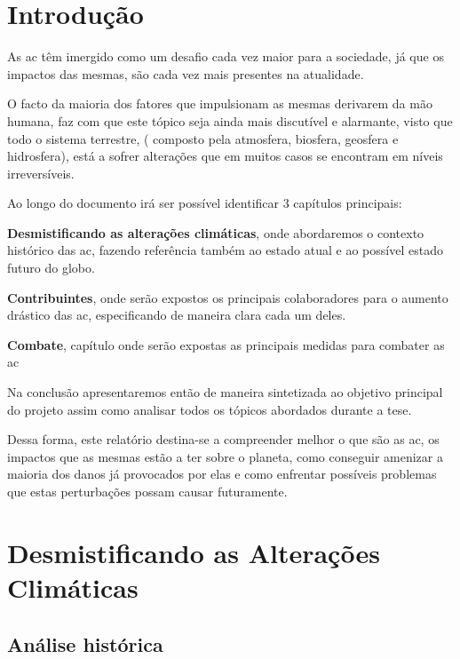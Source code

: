 \documentclass{report}
\begin{document}
\chapter{Introdução}
\label{chap.introducao}

As \ac{ac} têm imergido como um desafio cada vez maior para a sociedade, já que os impactos das mesmas, são cada vez mais presentes na atualidade.

O facto da maioria dos fatores que impulsionam as mesmas derivarem da mão humana, faz com que este tópico seja ainda mais discutível e alarmante, visto que todo o sistema terrestre, ( composto pela atmosfera, biosfera, geosfera e hidrosfera), está a sofrer alterações que em muitos casos se encontram em níveis irreversíveis.

Ao longo do documento irá ser possível identificar 3 capítulos principais:

\textbf{Desmistificando as alterações climáticas}, onde abordaremos o contexto histórico das \ac{ac}, fazendo referência também ao estado atual e ao possível estado futuro do globo.

\textbf{Contribuintes}, onde serão expostos os principais colaboradores para o aumento drástico das \ac{ac}, especificando de maneira clara cada um deles.

\textbf{Combate}, capítulo onde serão expostas as principais medidas para combater as \ac{ac}

Na conclusão apresentaremos então de maneira sintetizada ao objetivo principal do projeto assim como analisar todos os tópicos abordados durante a tese. 

Dessa forma, este relatório destina-se a compreender melhor o que são as \ac{ac}, os impactos que as mesmas estão a ter sobre o planeta, como conseguir amenizar a maioria dos danos já provocados por elas e como enfrentar possíveis problemas que estas perturbações possam causar futuramente. 



\chapter{Desmistificando as Alterações Climáticas}
\label{chap.metodologia}



\section{Análise histórica}
\end{document}

